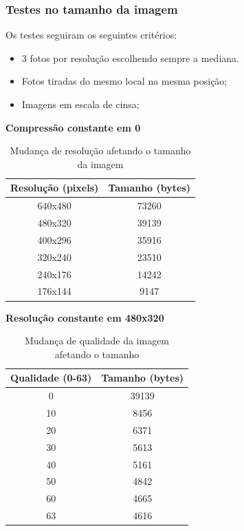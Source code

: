 \documentclass[12pt]{beamer}
\begin{document}
\begin{frame}[allowframebreaks]
    \frametitle{Testes no tamanho da imagem}
    Os testes seguiram os seguintes critérios:
    \begin{itemize}
        \item 3 fotos por resolução escolhendo sempre a mediana.
        \item Fotos tiradas do mesmo local na mesma posição;
        \item Imagens em escala de cinsa;
    \end{itemize}
    \framebreak
    \textbf{Compressão constante em 0}
    \begin{table}[!h]
        \centering
        \begin{tabular}{@{}c|c@{}}
            \toprule
            Resolução (pixels) & Tamanho (bytes) \\ \midrule
            640x480            & 73260           \\
            480x320            & 39139           \\
            400x296            & 35916           \\
            320x240            & 23510           \\
            240x176            & 14242           \\
            176x144            & 9147            \\ \bottomrule
        \end{tabular}
        \caption{Mudança de resolução afetando o tamanho da imagem}
        \label{tab:resolution}
    \end{table}
    \framebreak
    \textbf{Resolução constante em 480x320}
    \begin{table}[!h]
        \centering
        \begin{tabular}{@{}c|c@{}}
            \toprule
            Qualidade (0-63) & Tamanho (bytes) \\ \midrule
            0                & 39139           \\
            10               & 8456            \\
            20               & 6371            \\
            30               & 5613            \\
            40               & 5161            \\
            50               & 4842            \\
            60               & 4665            \\
            63               & 4616            \\ \bottomrule
        \end{tabular}
        \caption{Mudança de qualidade da imagem afetando o tamanho}
        \label{tab:quality}
    \end{table}
\end{frame}
\end{document}
